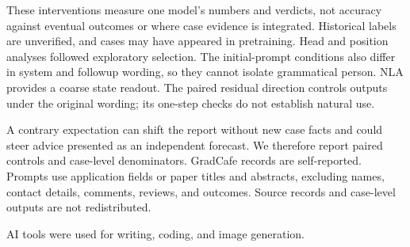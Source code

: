 \documentclass[10pt,letterpaper]{article}
\begin{document}

\fontsize{9.5pt}{11.4pt}\selectfont

These interventions measure one model's numbers and verdicts, not accuracy against eventual outcomes or where case evidence is integrated. Historical labels are unverified, and cases may have appeared in pretraining. Head and position analyses followed exploratory selection. The initial-prompt conditions also differ in system and followup wording, so they cannot isolate grammatical person. NLA provides a coarse state readout. The paired residual direction controls outputs under the original wording; its one-step checks do not establish natural use.

A contrary expectation can shift the report without new case facts and could steer advice presented as an independent forecast. We therefore report paired controls and case-level denominators. GradCafe records are self-reported. Prompts use application fields or paper titles and abstracts, excluding names, contact details, comments, reviews, and outcomes. Source records and case-level outputs are not redistributed.

\par\vspace{4pt}\par\vspace{-1pt}

\noindent AI tools were used for writing, coding, and image generation.
\end{document}

